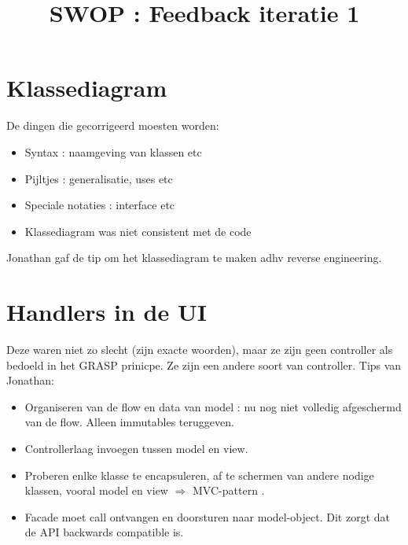 \documentclass[DIV=calc,11pt ]{scrartcl}
\begin{document}
\title{SWOP : Feedback iteratie 1}
\maketitle

\newpage
\section{Klassediagram}
De dingen die gecorrigeerd moesten worden:
\begin{itemize}
\item Syntax : naamgeving van klassen etc
\item Pijltjes : generalisatie, uses etc
\item Speciale notaties : interface etc
\item Klassediagram was niet consistent met de code
\end{itemize}
Jonathan gaf de tip om het klassediagram te maken adhv reverse engineering.

\section{Handlers in de UI}
Deze waren niet zo slecht (zijn exacte woorden), maar ze zijn geen controller als bedoeld in het GRASP prinicpe. Ze zijn een andere soort van controller.
Tips van Jonathan:
\begin{itemize}
\item Organiseren van de flow en data van model : nu nog niet volledig afgeschermd van de flow. Alleen immutables teruggeven.
\item Controllerlaag invoegen tussen model en view.
\item Proberen enlke klasse te encapsuleren, af te schermen van andere nodige klassen, vooral model en view $\Rightarrow$ MVC-pattern .
\item Facade moet call ontvangen en doorsturen naar model-object. Dit zorgt dat de API backwards compatible is.
\end{itemize}
\end{document}
